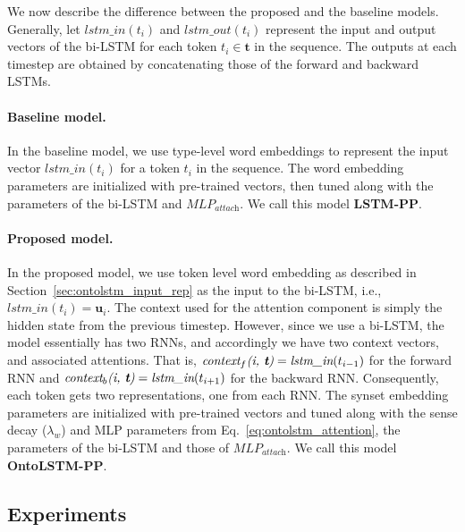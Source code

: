 We now describe the difference between the proposed and the baseline models. Generally, let $\textit{lstm\_in}(t_i)$ and $\textit{lstm\_out}(t_i)$ represent the input and output vectors of the bi-LSTM for each token $t_i \in \boldsymbol{t}$ in the sequence. The outputs at each timestep are obtained by concatenating those of the forward and backward LSTMs.

\paragraph{Baseline model.}
In the baseline model, we use type-level word embeddings to represent the input vector $\textit{lstm\_in}(t_i)$ for a token $t_i$ in the sequence. The word embedding parameters are initialized with pre-trained vectors, then tuned along with the parameters of the bi-LSTM and $\textit{MLP}_{\textit{attach}}$. We call this model \textbf{LSTM-PP}.

\paragraph{Proposed model.}
\label{sec:ontolstm_proposed_ppa_model}
In the proposed model, we use token level word embedding as described in Section~\ref{sec:ontolstm_input_rep} as the input to the bi-LSTM, i.e., $\textit{lstm\_in}(t_i) = \mathbf{u}_i$. The context used for the attention component is simply the hidden state from the previous timestep. However, since we use a bi-LSTM, the model essentially has two RNNs, and accordingly we have two context vectors, and associated attentions. That is, $\textit{context}_f\textit{(i, \textbf{t})} = \textit{lstm\_in}(t_{i-1})$ for the forward RNN and $\textit{context}_b\textit{(i, \textbf{t})} = \textit{lstm\_in}(t_{i+1})$ for the backward RNN\@. Consequently, each token gets two representations, one from each RNN\@. The synset embedding parameters are initialized with pre-trained vectors and tuned along with the sense decay ($\lambda_{w}$) and MLP parameters from Eq.~\ref{eq:ontolstm_attention}, the parameters of the bi-LSTM and those of $\textit{MLP}_{\textit{attach}}$. We call this model \textbf{OntoLSTM-PP}.

\subsection{Experiments}
\label{sec:ontolstm_pp_experiments} 

